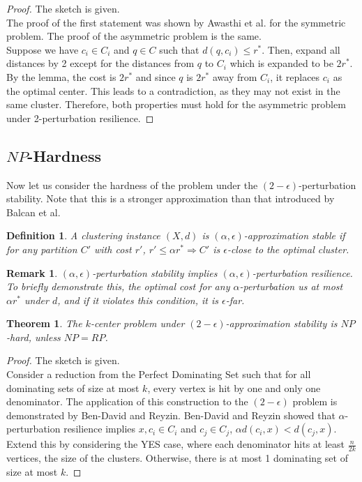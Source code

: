 \documentclass{article}
\newtheorem{theorem}{Theorem}
\newtheorem{definition}{Definition}
\newtheorem{remark}{Remark}
\begin{document}
\begin{proof}
The sketch is given.\\

The proof of the first statement was shown by Awasthi et al. for the symmetric problem. The proof of the asymmetric problem is the same.\\

Suppose we have $c_i\in C_i$ and $q\in C$ such that $d(q,c_i)\leq r^*$. Then, expand all distances by 2 except for the distances from $q$ to $C_i$ which is expanded to be $2r^*$. By the lemma, the cost is $2r^*$ and since $q$ is $2r^*$ away from $C_i$, it replaces $c_i$ as the optimal center. This leads to a contradiction, as they may not exist in the same cluster. Therefore, both properties must hold for the asymmetric problem under 2-perturbation resilience.
\end{proof}

\subsection{$NP$-Hardness}

Now let us consider the hardness of the problem under the $(2-\epsilon)$-perturbation stability. Note that this is a stronger approximation than that introduced by Balcan et al.

\begin{definition}
A clustering instance $(X,d)$ is $(\alpha,\epsilon)$-\emph{approximation stable} if for any partition $C'$ with cost $r'$, $r'\leq\alpha r^*\Rightarrow C'$ is $\epsilon$-close to the optimal cluster.
\end{definition}

\begin{remark}
$(\alpha,\epsilon)$-perturbation stability implies $(\alpha,\epsilon)$-perturbation resilience. To briefly demonstrate this, the optimal cost for any $\alpha$-perturbation us at most $\alpha r^*$ under $d$, and if it violates this condition, it is $\epsilon$-far.
\end{remark}

\begin{theorem}
The $k$-center problem under $(2-\epsilon)$-approximation stability is $NP$-hard, unless $NP=RP$.
\end{theorem}

\begin{proof}
The sketch is given.\\

Consider a reduction from the Perfect Dominating Set such that for all dominating sets of size at most $k$, every vertex is hit by one and only one denominator. The application of this construction to the $(2-\epsilon)$ problem is demonstrated by Ben-David and Reyzin. Ben-David and Reyzin showed that $\alpha$-perturbation resilience implies $x,c_i\in C_i$ and $c_j\in C_j$, $\alpha d(c_i,x)<d(c_j,x)$. Extend this by considering the YES case, where each denominator hits at least $\frac n{2k}$ vertices, the size of the clusters. Otherwise, there is at most 1 dominating set of size at most $k$.
\end{proof}
\end{document}
